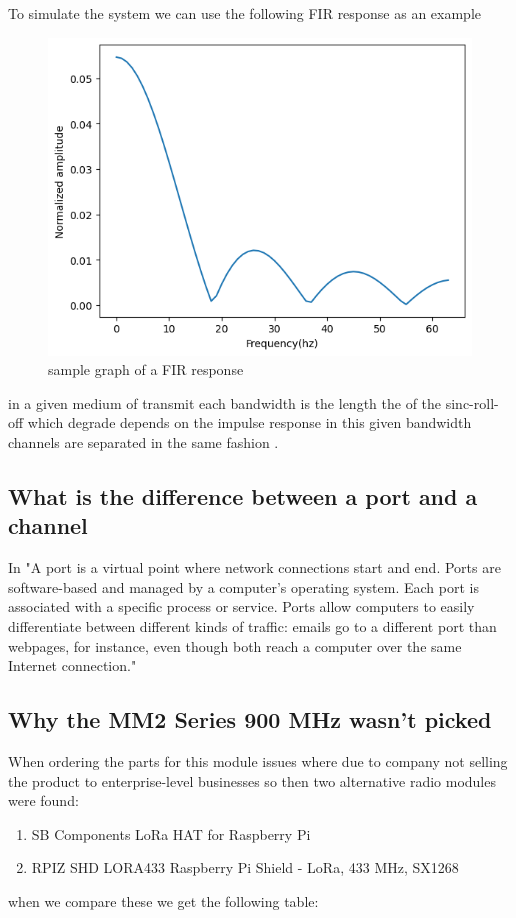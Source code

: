 To simulate the system we can use the following FIR response  as an example 
\begin{figure}[h!]
    \includegraphics[width=0.5\linewidth]{Images/FIR_response.png}
    \caption{sample graph of a FIR response}
    \label{sample graph of a FIR response}

\end{figure}
in a given  medium  of  transmit each bandwidth is the length the of the  sinc-roll-off which degrade depends on the  impulse response in this given bandwidth channels are separated in the same fashion .
\subsection{What is  the difference  between a  port and a channel}
In \cite{flare} "A port is a virtual point where network connections start and end. Ports are software-based and managed by a computer's operating system. Each port is associated with a specific process or service. Ports allow computers to easily differentiate between different kinds of traffic: emails go to a different port than webpages, for instance, even though both reach a computer over the same Internet connection."
\newpage
\subsection{Why the MM2 Series 900 MHz wasn't picked}
When ordering the parts for  this module issues where due to company not selling the product to  enterprise-level businesses so then two alternative radio modules were found:
\begin{enumerate}
    \item SB Components LoRa HAT for Raspberry Pi
    \item RPIZ SHD LORA433 Raspberry Pi Shield - LoRa, 433 MHz, SX1268
\end{enumerate}
when we compare these we get the following table:

